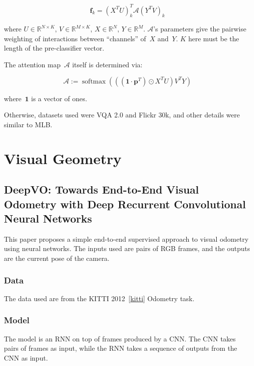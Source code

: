 \documentclass[a4paper, 12pt]{article}
\DeclareMathOperator{\softmax}{softmax}
\begin{document}
\begin{equation}
\mathbf{f}_k = {(X^T U)}^T_k \mathcal{A} {(Y^T V)}_k
\end{equation}

where $U \in \mathbb{R}^{N \times K}$, $V \in \mathbb{R}^{M \times K}$,
$X \in \mathbb{R}^N$, $Y \in \mathbb{R}^M$. $\mathcal{A}$'s parameters give the
pairwise weighting of interactions between ``channels'' of~$X$ and~$Y$. $K$
here must be the length of the pre-classifier vector.

The attention map~$\mathcal{A}$ itself is determined via:

\begin{equation}
        \mathcal{A} := \softmax\left(((\mathbf{1} \cdot \mathbf{p}^T) \odot X^T U) V^T Y\right)
\end{equation}

where~$\mathbf{1}$ is a vector of ones.

Otherwise, datasets used were VQA 2.0 and Flickr 30k, and other details were
similar to MLB\@.


\section{Visual Geometry}

\subsection{DeepVO\@: Towards End-to-End Visual Odometry with Deep Recurrent
            Convolutional Neural Networks~\citet{wang-deep-vo-2017}}

This paper proposes a simple end-to-end supervised approach to visual odometry
using neural networks. The inputs used are pairs of RGB frames, and the outputs
are the current pose of the camera.


\subsubsection{Data}

The data used are from the KITTI 2012~\ref{kitti} Odometry task.


\subsubsection{Model}

The model is an RNN on top of frames produced by a CNN\@. The CNN takes pairs
of frames as input, while the RNN takes a sequence of outputs from the CNN as
input.
\end{document}

